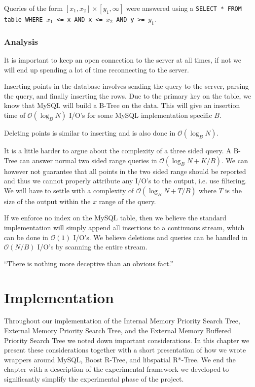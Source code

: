 \documentclass[twoside,11pt,openright]{report}
\begin{document}
Queries of the form $\left[x_1,x_2\right] \times \left[y_1,\infty\right]$ were answered using a \texttt{SELECT * FROM table WHERE $x_1$ <= x AND x <= $x_2$ AND y >= $y_1$}.

\subsection{Analysis}
It is important to keep an open connection to the server at all times, if not we will end up spending a lot of time reconnecting to the server.

Inserting points in the database involves sending the query to the server, parsing the query, and finally inserting the rows. Due to the primary key on the table, we know that MySQL will build a B-Tree on the data. This will give an insertion time of $\mathcal{O}(\log_B N)$ I/O's for some MySQL implementation specific $B$.

Deleting points is similar to inserting and is also done in $\mathcal{O}(\log_B N)$.

It is a little harder to argue about the complexity of a three sided query. A B-Tree can answer normal two sided range queries in $\mathcal{O}(\log_B N + K/B)$. We can however not guarantee that all points in the two sided range should be reported and thus we cannot properly attribute any I/O's to the output, i.e. use filtering. We will have to settle with a complexity of $\mathcal{O}(\log_B N + T/B)$ where $T$ is the size of the output within the $x$ range of the query.

If we enforce no index on the MySQL table, then we believe the standard implementation will simply append all insertions to a continuous stream, which can be done in $\mathcal{O}(1)$ I/O's. We believe deletions and queries can be handled in $\mathcal{O}(N/B)$ I/O's by scanning the entire stream.

\begin{savequote}[0.7\textwidth]
``There is nothing more deceptive than an obvious fact.''
\end{savequote}
\chapter{Implementation}
\label{chp:implementation}

Throughout our implementation of the Internal Memory Priority Search Tree, External Memory Priority Search Tree, and the External Memory Buffered Priority Search Tree we noted down important considerations.
In this chapter we present these considerations together with a short presentation of how we wrote wrappers around MySQL, Boost R-Tree, and libspatial R*-Tree. We end the chapter with a description of the experimental framework we developed to significantly simplify the experimental phase of the project.
\end{document}
